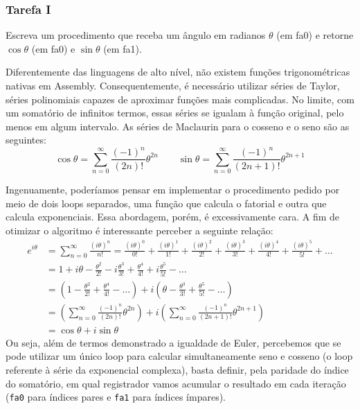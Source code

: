 \documentclass[a4paper,12pt]{article}
\newcommand{\cod}[1]{\texttt{#1}}
\begin{document}
\subsubsection{Tarefa I}

\begin{tcolorbox}[title=Enunciado, colback=blue!5!white, colframe=blue!75!black]
Escreva um procedimento que receba um ângulo em radianos $\theta$ (em fa0) e retorne $\cos{\theta}$ (em fa0) e $\sin{\theta}$ (em fa1).
\end{tcolorbox}

Diferentemente das linguagens de alto nível, não existem funções trigonométricas nativas em Assembly. Consequentemente, é necessário utilizar séries de Taylor, séries polinomiais capazes de aproximar funções mais complicadas. No limite, com um somatório de infinitos termos, essas séries se igualam à função original, pelo menos em algum intervalo. As séries de Maclaurin para o cosseno e o seno são as seguintes:
\begin{equation*}
    \cos \theta = \sum_{n=0}^\infty \frac{(-1)^n}{(2n)!} \theta^{2n}  \quad \quad \sin \theta = \sum_{n=0}^\infty \frac{(-1)^n}{(2n+1)!} \theta^{2n+1}
\end{equation*}

Ingenuamente, poderíamos pensar em implementar o procedimento pedido por meio de dois loops separados, uma função que calcula o fatorial e outra que calcula exponenciais. Essa abordagem, porém, é excessivamente cara. A fim de otimizar o algoritmo é interessante perceber a seguinte relação:
\begin{align*}
    e^{i\theta} &= \sum_{n=0}^\infty \frac{(i\theta)^n}{n!} = \frac{(i\theta)^0}{0!} + \frac{(i\theta)^1}{1!} + \frac{(i\theta)^2}{2!} + \frac{(i\theta)^3}{3!} + \frac{(i\theta)^4}{4!} + \frac{(i\theta)^5}{5!} + \dots\\
    &= 1 + i\theta - \frac{\theta^2}{2!} - i \frac{\theta^3}{3!} + \frac{\theta^4}{4!} + i\frac{\theta^5}{5!} - \dots \\
    &= \left(1 - \frac{\theta^2}{2!} + \frac{\theta^4}{4!} - \dots \right)
    + i \left(\theta - \frac{\theta^3}{3!} + \frac{\theta^5}{5!} - \dots \right) \\
    &= \left(\sum_{n=0}^\infty \frac{(-1)^n}{(2n)!} \theta^{2n}\right)
    + i \left(\sum_{n=0}^\infty \frac{(-1)^n}{(2n+1)!} \theta^{2n+1}\right) \\
    &= \cos{\theta} + i\sin{\theta}
\end{align*}
Ou seja, além de termos demonstrado a igualdade de Euler, percebemos que se pode utilizar um único loop para calcular simultaneamente seno e cosseno (o loop referente à série da exponencial complexa), basta definir, pela paridade do índice do somatório, em qual registrador vamos acumular o resultado em cada iteração (\cod{fa0} para índices pares e \cod{fa1} para índices ímpares).
\end{document}
